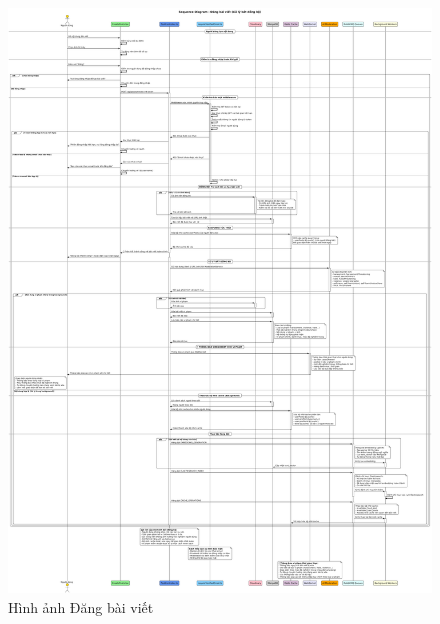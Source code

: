 \begin{figure}[H]
    \centering
    \includegraphics[width=1\textwidth]{image/sequence/dang-bai-viet.png}
    \caption{Hình ảnh Đăng bài viết}
    \label{fig:dang_bai_viet}
\end{figure}

